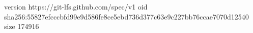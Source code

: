 version https://git-lfs.github.com/spec/v1
oid sha256:55827efcccbfd99e9d586fe8ce5ebd736d377c63e9c227bb76ccae7070d12540
size 174916
